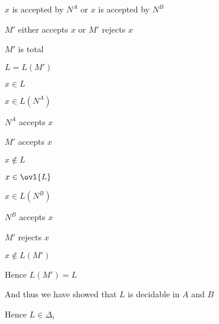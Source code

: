 \imp
$x$ is accepted by $N^A$ or $x$ is accepted by $N^B$

\imp
$M'$ either accepts $x$ or $M'$ rejects $x$

\imp
$M'$ is total

$L = L(M')$

$x \in L$

\imp
$x \in L(N^A)$

\imp
$N^A$ accepts $x$

\imp
$M'$ accepts $x$


$x \notin L$

\imp
$x \in \ovl{L}$

\imp
$x \in L(N^B)$

\imp
$N^B$ accepts $x$

\imp
$M'$ rejects $x$

\imp
$x \notin L(M')$



Hence $L(M') = L$

And thus we have showed that $L$ is decidable in $A$ and $B$

Hence $L \in \Delta_i$










